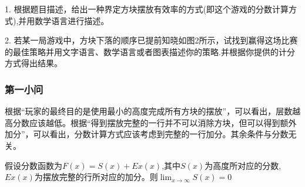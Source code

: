 \documentclass[lang=cn,a4paper]{elegantpaper}
\begin{document}
    1. 根据题目描述，给出一种界定方块摆放有效率的方式(即这个游戏的分数计算方式),并用数学语言进行描述。

    2. 若某一局游戏中，方块下落的顺序已提前知晓如图2所示，试找到赢得这场比赛的最佳策略并用文字语言、数学语言或者图表描述你的策略.并根据你提供的计分方式得出结果。
    \subsubsection{第一小问}
    根据“玩家的最终目的是使用最小的高度完成所有方块的摆放”，可以看出，层数越高分数应该越低。根据“得到摆放完整的一行并不可以消除方块，但可以得到额外加分”，可以看出，分数计算方式应该考虑到完整的一行加分。其余条件与分数无关。

    假设分数函数为$F(x)=S(x)+Ex(x)$,其中$S(x)$为高度所对应的分数,$Ex(x)$为摆放完整的行所对应的加分。则$\displaystyle\lim_{x\rightarrow \infty}S(x)=0$
\end{document}
